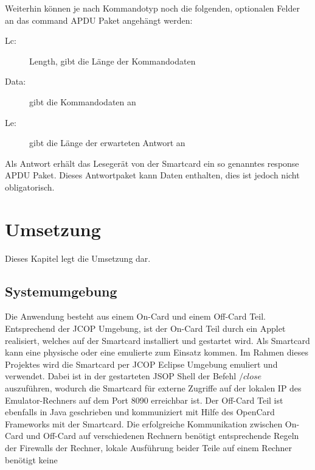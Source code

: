 \documentclass[a4paper,12pt]{scrartcl}
\begin{document}
Weiterhin können je nach Kommandotyp noch die folgenden, optionalen Felder an das command APDU Paket angehängt werden:


\begin{description}
\item[Lc:] Length, gibt die Länge der Kommandodaten
\item[Data:] gibt die Kommandodaten an
\item[Le:] gibt die Länge der erwarteten Antwort an
\end{description}

Als Antwort erhält das Lesegerät von der Smartcard ein so genanntes response APDU Paket. Dieses Antwortpaket kann Daten enthalten, dies ist jedoch nicht obligatorisch. 


\clearpage
\section{Umsetzung}
\label{sec:3}

Dieses Kapitel legt die Umsetzung dar.

\subsection{Systemumgebung}
\label{subsec:3.1}

Die Anwendung besteht aus einem On-Card und einem Off-Card Teil.
Entsprechend der JCOP Umgebung, ist der On-Card Teil durch ein Applet realisiert, welches auf der Smartcard installiert und gestartet wird.
Als Smartcard kann eine physische oder eine emulierte zum Einsatz kommen.
Im Rahmen dieses Projektes wird die Smartcard per JCOP Eclipse Umgebung emuliert und verwendet.
Dabei ist in der gestarteten JSOP Shell der Befehl $/close$ auszuführen, wodurch die Smartcard für externe  Zugriffe auf der lokalen IP des Emulator-Rechners auf dem Port 8090 erreichbar ist.
Der Off-Card Teil ist ebenfalls in Java geschrieben und kommuniziert mit Hilfe des OpenCard Frameworks mit der Smartcard.
Die erfolgreiche Kommunikation zwischen On-Card und Off-Card auf verschiedenen Rechnern benötigt entsprechende Regeln der Firewalls der Rechner, lokale Ausführung beider Teile auf einem Rechner benötigt keine 

\end{document}
